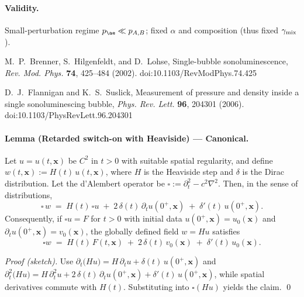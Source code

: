 \documentclass[reprint,aps,onecolumn,nofootinbib]{revtex4-2}
\begin{document}
    \paragraph{Validity.} Small-perturbation regime $p_{\ae}\ll p_{A,B}$; fixed $\alpha$ and composition (thus fixed $\gamma_{\rm mix}$).

        \begin{thebibliography}{9}
        M.~P.~Brenner, S.~Hilgenfeldt, and D.~Lohse,
        \newblock Single-bubble sonoluminescence,
        \newblock \emph{Rev. Mod. Phys.} \textbf{74}, 425–484 (2002). doi:10.1103/RevModPhys.74.425

        D.~J.~Flannigan and K.~S.~Suslick,
        \newblock Measurement of pressure and density inside a single sonoluminescing bubble,
        \newblock \emph{Phys. Rev. Lett.} \textbf{96}, 204301 (2006). doi:10.1103/PhysRevLett.96.204301
        \end{thebibliography}


    \paragraph{Lemma (Retarded switch-on with Heaviside) — Canonical.}
        Let $u=u(t,\mathbf{x})$ be $C^2$ in $t>0$ with suitable spatial regularity, and define $w(t,\mathbf{x}) := H(t)\,u(t,\mathbf{x})$, where $H$ is the Heaviside step and $\delta$ is the Dirac distribution.
        Let the d’Alembert operator be $\square := \partial_t^2 - c^2 \nabla^2$. Then, in the sense of distributions,
        \[
            \square\,w \;=\; H(t)\,\square u \;+\; 2\,\delta(t)\,\partial_t u(0^+,\mathbf{x}) \;+\; \delta'(t)\,u(0^+,\mathbf{x}).
        \]
        Consequently, if $\square u = F$ for $t>0$ with initial data $u(0^+,\mathbf{x})=u_0(\mathbf{x})$ and $\partial_t u(0^+,\mathbf{x})=v_0(\mathbf{x})$, the globally defined field $w=H u$ satisfies
        \[
            \square w \;=\; H(t)\,F(t,\mathbf{x}) \;+\; 2\,\delta(t)\,v_0(\mathbf{x}) \;+\; \delta'(t)\,u_0(\mathbf{x}).
        \]

        \emph{Proof (sketch).}
        Use $\partial_t\!\big(Hu\big)=H\,\partial_t u+\delta(t)\,u(0^+,\mathbf{x})$ and
        $\partial_t^2\!\big(Hu\big)=H\,\partial_t^2u+2\,\delta(t)\,\partial_t u(0^+,\mathbf{x})+\delta'(t)\,u(0^+,\mathbf{x})$,
        while spatial derivatives commute with $H(t)$. Substituting into $\square(Hu)$ yields the claim. \qed
\end{document}
